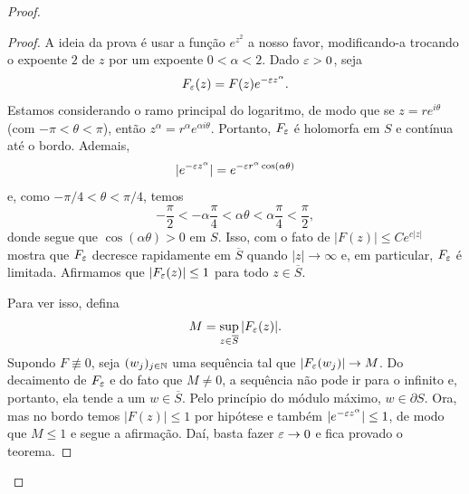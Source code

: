 \begin{proof}
            \begin{proof}
                A ideia da prova é usar a função $e^{z^2}$ a nosso favor,
                modificando-a trocando o expoente $2$ de $z$ por um expoente
                $0<\alpha<2$. Dado $\varepsilon>0$, seja
                \begin{equation*}
                    F_{\varepsilon}(z) = F(z)e^{-\varepsilon z^{\alpha}}.
                \end{equation*}
                Estamos considerando o ramo principal do logaritmo, de modo
                que se $z = re^{i\theta}$ (com $-\pi < \theta < \pi$), então
                $z^{\alpha} = r^{\alpha}e^{\alpha i\theta}$. Portanto,
                $F_{\varepsilon}$ é holomorfa em $S$ e contínua até o bordo.
                Ademais,
                \begin{equation*}
                    |e^{-\varepsilon z^{\alpha}}| = e^{-\varepsilon r^{\alpha}\cos (\alpha\theta)}
                \end{equation*}
                e, como $-\pi /4 < \theta < \pi /4$, temos
                \begin{equation*}
                    -\frac{\pi}{2} < -\alpha\frac{\pi}{4} 
                    < \alpha\theta < \alpha\frac{\pi}{4} < \frac{\pi}{2},
                \end{equation*}
                donde segue que $\cos(\alpha\theta) > 0$ em $S$. Isso, com
                o fato de $|F(z)| \leq Ce^{c|z|}$ mostra que $F_{\varepsilon}$ decresce
                rapidamente em $\overline{S}$ quando $|z|\to\infty$ e, em
                particular, $F_{\varepsilon}$ é limitada. Afirmamos que 
                $|F_{\varepsilon}(z)| \leq 1$ para todo $z\in\overline{S}$.
                
                Para ver isso, defina
                \begin{equation*}
                    M = \sup_{z\in\overline{S}} |F_{\varepsilon}(z)|.
                \end{equation*}
                Supondo $F\not\equiv 0$, seja $(w_j)_{j\in\mathbb{N}}$ uma sequência tal 
                que $|F_{\varepsilon}(w_j)|\to M$. Do decaimento de $F_{\varepsilon}$ e 
                do fato que $M\neq 0$, a sequência não pode ir para o
                infinito e, portanto, ela tende a um $w\in\overline{S}$.
                Pelo princípio do módulo máximo, $w\in\partial S$. Ora, 
                mas no bordo temos $|F(z)| \leq 1$
                por hipótese e também $|e^{-\varepsilon z^{\alpha}}| \leq 1$, de
                modo que $M\leq 1$ e segue a afirmação. Daí, basta fazer
                $\varepsilon\to 0$ e fica provado o teorema.
            \end{proof}
            

\end{proof}
